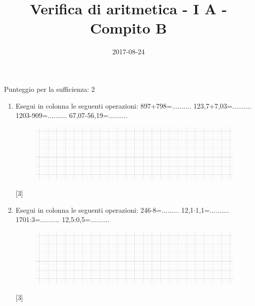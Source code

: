 \documentclass[11pt,fleqn]{article} %
\title{Verifica di aritmetica - I A - Compito B}
\date{2017-08-24}
\newcommand{\T}{\cdot}
\begin{document}
\maketitle
Punteggio per la sufficienza: 2
\begin{enumerate}

\item Esegui in colonna le seguenti operazioni: 897+798=.......... 123,7+7,03=.......... 1203-909=.......... 67,07-56,19=..........
\begin{figure}[h]
	\centering
		\includegraphics[width=13cm]{figure/quadretti.png}
\end{figure}
 [3] 
\item Esegui in colonna le seguenti operazioni: 246$\T$8=......... 12,1$\T$1,1=.......... 1701:3=.......... 12,5:0,5=..........
\begin{figure}[h]
	\centering
		\includegraphics[width=13cm]{figure/quadretti.png}
\end{figure} [3] 
\end{enumerate}
\end{document}

